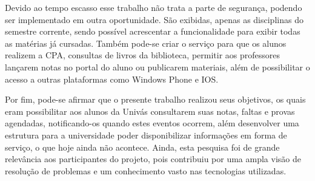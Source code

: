 	\par Devido ao tempo escasso esse trabalho não trata a parte de segurança,
podendo ser implementado em outra oportunidade. São exibidas, apenas as
disciplinas do semestre corrente, sendo possível acrescentar a funcionalidade
para exibir todas as matérias já cursadas. Também pode-se criar o serviço para
que os alunos realizem a CPA, consultas de livros da biblioteca, permitir aos
professores lançarem notas no portal do aluno ou publicarem materiais, além de
possibilitar o acesso a outras plataformas como Windows Phone e IOS.

	\par Por fim, pode-se afirmar que o presente trabalho realizou seus objetivos,
os quais eram possibilitar aos alunos da Univás consultarem suas notas, faltas
e provas agendadas, notificando-os quando estes eventos ocorrem, além
desenvolver uma estrutura para a universidade poder disponibilizar informações
em forma de serviço, o que hoje ainda não acontece. Ainda, esta pesquisa foi de
grande relevância aos participantes do projeto, pois contribuiu por uma ampla
visão de resolução de problemas e um conhecimento vasto nas tecnologias
utilizadas.
